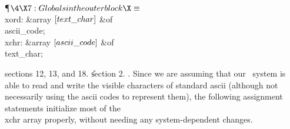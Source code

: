 \Y\P$\4\X7:Globals in the outer block\X\S$\6
\4\\{xord}: \&{array} $[\\{text\_char}]$ \1\&{of}\5
\\{ascii\_code};\2\6
\4\\{xchr}: \&{array} $[\\{ascii\_code}]$ \1\&{of}\5
\\{text\_char};\2\par
\A sections 12, 13, and 18.
\U section 2.\fi
{}. Since we are assuming that our \PASCAL\ system is able to read and write
the
visible characters of standard ascii (although not necessarily using the
ascii codes to represent them), the following assignment statements initialize
most of the \\{xchr} array properly, without needing any system-dependent
changes.

